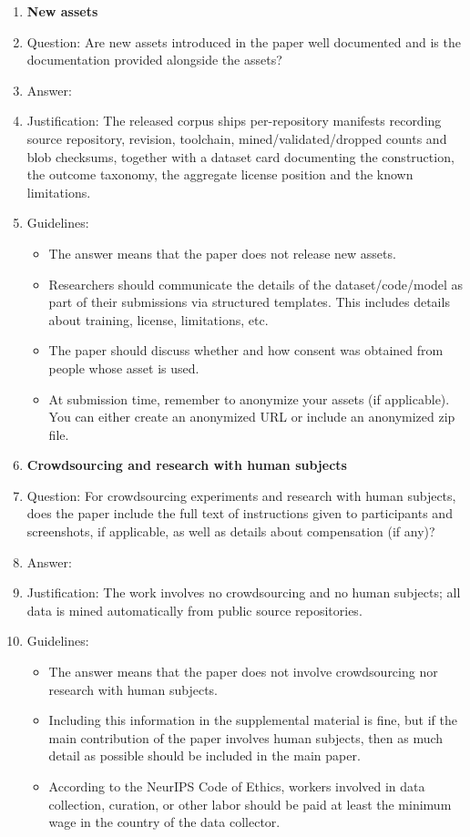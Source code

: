 \begin{enumerate}
\item {\bf New assets}
    \item[] Question: Are new assets introduced in the paper well documented and is the documentation provided alongside the assets?
    \item[] Answer: \answerYes{}
    \item[] Justification: The released corpus ships per-repository manifests recording source repository, revision, toolchain, mined/validated/dropped counts and blob checksums, together with a dataset card documenting the construction, the outcome taxonomy, the aggregate license position and the known limitations.
    \item[] Guidelines:
    \begin{itemize}
        \item The answer \answerNA{} means that the paper does not release new assets.
        \item Researchers should communicate the details of the dataset\slash code\slash model as part of their submissions via structured templates. This includes details about training, license, limitations, etc. 
        \item The paper should discuss whether and how consent was obtained from people whose asset is used.
        \item At submission time, remember to anonymize your assets (if applicable). You can either create an anonymized URL or include an anonymized zip file.
    \end{itemize}

\item {\bf Crowdsourcing and research with human subjects}
    \item[] Question: For crowdsourcing experiments and research with human subjects, does the paper include the full text of instructions given to participants and screenshots, if applicable, as well as details about compensation (if any)? 
    \item[] Answer: \answerNA{}
    \item[] Justification: The work involves no crowdsourcing and no human subjects; all data is mined automatically from public source repositories.
    \item[] Guidelines:
    \begin{itemize}
        \item The answer \answerNA{} means that the paper does not involve crowdsourcing nor research with human subjects.
        \item Including this information in the supplemental material is fine, but if the main contribution of the paper involves human subjects, then as much detail as possible should be included in the main paper. 
        \item According to the NeurIPS Code of Ethics, workers involved in data collection, curation, or other labor should be paid at least the minimum wage in the country of the data collector. 
    \end{itemize}


\end{enumerate}

